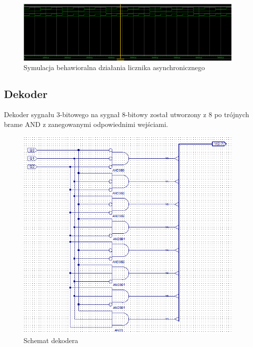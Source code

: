 \documentclass[wide,a4paper,titlepage,12pt] {article}
\begin{document}
  \begin{figure}[htbp]
    \begin{center}
      \includegraphics[scale=0.2]{licznik_beh.png}
      \caption{Symulacja behawioralna działania licznika asynchronicznego}
    \end{center}
  \end{figure}

  \subsection{Dekoder}
  Dekoder sygnału 3-bitowego na sygnał 8-bitowy został utworzony z 8 po trójnych brame AND z zanegowanymi odpowiednimi wejściami.

  \begin{figure}[htbp]
    \begin{center}
      \includegraphics[scale=0.6]{dekoder.png}
      \caption{Schemat dekodera}
    \end{center}
  \end{figure}
\end{document}
